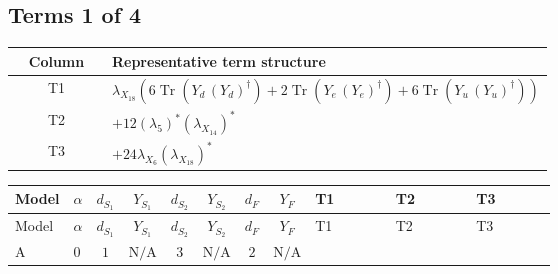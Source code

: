 \documentclass[8pt]{article}
\begin{document}
\begin{landscape}
\subsection*{Terms 1 of 4}
\begin{center}
\begin{tabular}{@{}c >{\raggedright\arraybackslash}p{0.82\linewidth}@{}}
\toprule
Column & Representative term structure \\
\midrule
T1 & \(\displaystyle {\lambda_{X_{18}}} (6 \operatorname{Tr}\!\left({Y_d}\,\left({Y_d}\right)^{\dagger}\right)+2 \operatorname{Tr}\!\left({Y_e}\,\left({Y_e}\right)^{\dagger}\right)+6 \operatorname{Tr}\!\left({Y_u}\,\left({Y_u}\right)^{\dagger}\right))\) \\
\midrule
T2 & \(\displaystyle +12 \left({\lambda_5}\right)^{*} \left({\lambda_{X_{14}}}\right)^{*}\) \\
\midrule
T3 & \(\displaystyle +24 {\lambda_{X_{6}}} \left({\lambda_{X_{18}}}\right)^{*}\) \\
\midrule
\bottomrule
\end{tabular}
\end{center}
\smallskip
\tiny
\begin{longtable}{@{}llcccccc >{\raggedright\arraybackslash}p{0.21\linewidth} >{\raggedright\arraybackslash}p{0.21\linewidth} >{\raggedright\arraybackslash}p{0.21\linewidth}@{}}
\toprule
Model & $\alpha$ & $d_{S_1}$ & $Y_{S_1}$ & $d_{S_2}$ & $Y_{S_2}$ & $d_F$ & $Y_F$ & T1 & T2 & T3 \\
\midrule
\endfirsthead
\toprule
Model & $\alpha$ & $d_{S_1}$ & $Y_{S_1}$ & $d_{S_2}$ & $Y_{S_2}$ & $d_F$ & $Y_F$ & T1 & T2 & T3 \\
\midrule
\endhead
A & $0$ & $1$ & $\text{N/A}$ & $3$ & $\text{N/A}$ & $2$ & $\text{N/A}$ & \scriptsize\adjustbox{max width=\linewidth}{$\begin{gathered} {\lambda_{X_{18}}} (6 \operatorname{Tr}\!\left({Y_d}\,\left({Y_d}\right)^{\dagger}\right)+2 \operatorname{Tr}\!\left({Y_e}\,\left({Y_e}\right)^{\dagger}\right)+6 \operatorname{Tr}\!\left({Y_u}\,\left({Y_u}\right)^{\dagger}\right))\end{gathered}$} & \scriptsize\adjustbox{max width=\linewidth}{$\begin{gathered} +12 \left({\lambda_5}\right)^{*} \left({\lambda_{X_{14}}}\right)^{*}\end{gathered}$} & \scriptsize\adjustbox{max width=\linewidth}{$\begin{gathered} +24 {\lambda_{X_{6}}} \left({\lambda_{X_{18}}}\right)^{*}\end{gathered}$} \\

\end{longtable}
\end{landscape}
\end{document}
